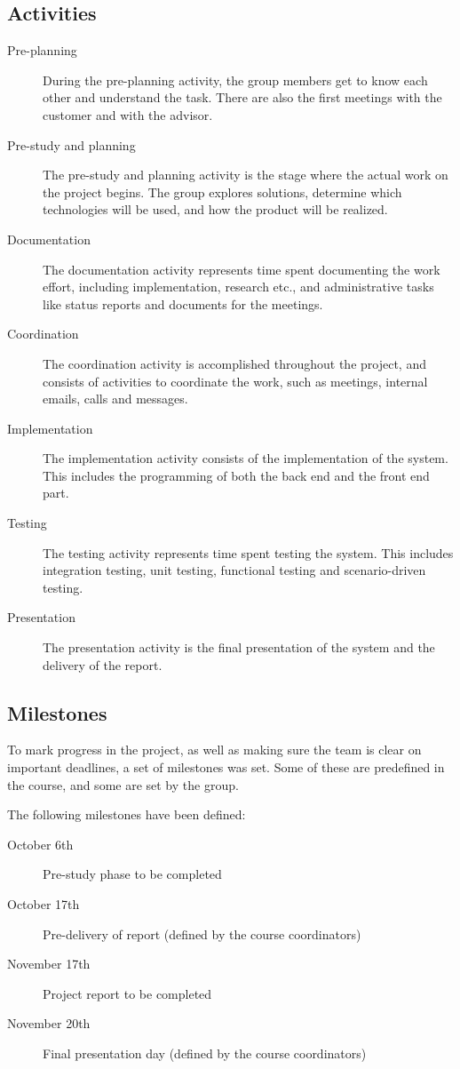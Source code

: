 \documentclass[11pt,a4paper,titlepage,oneside]{report}
\begin{document}
\subsection{Activities}
\begin{description}
\item[Pre-planning] During the pre-planning activity, the group members get to know each other and understand the task. There are also the first meetings with the customer and with the advisor.
\item[Pre-study and planning] The pre-study and planning activity is the stage where the actual work on the project begins. The group explores solutions, determine which technologies will be used, and how the product will be realized.
\item[Documentation] The documentation activity represents time spent documenting the work effort, including implementation, research etc., and administrative tasks like status reports and documents for the meetings.
\item[Coordination] The coordination activity is accomplished throughout the project, and consists of activities to coordinate the work, such as meetings, internal emails, calls and messages.
\item[Implementation] The implementation activity consists of the implementation of the system. This includes the programming of both the back end and the front end part.
\item[Testing] The testing activity represents time spent testing the system. This includes integration testing, unit testing, functional testing and scenario-driven testing.
\item[Presentation] The presentation activity is the final presentation of the system and the delivery of the report.
\end{description}

\subsection{Milestones}
To mark progress in the project, as well as making sure the team is clear on important deadlines, a set of milestones was set. Some of these are predefined in the course, and some are set by the group. 

The following milestones have been defined:
\begin{description}
\item[October 6th] Pre-study phase to be completed
\item[October 17th] Pre-delivery of report (defined by the course coordinators)
\item[November 17th] Project report to be completed
\item[November 20th] Final presentation day (defined by the course coordinators)
\end{description}
\end{document}
